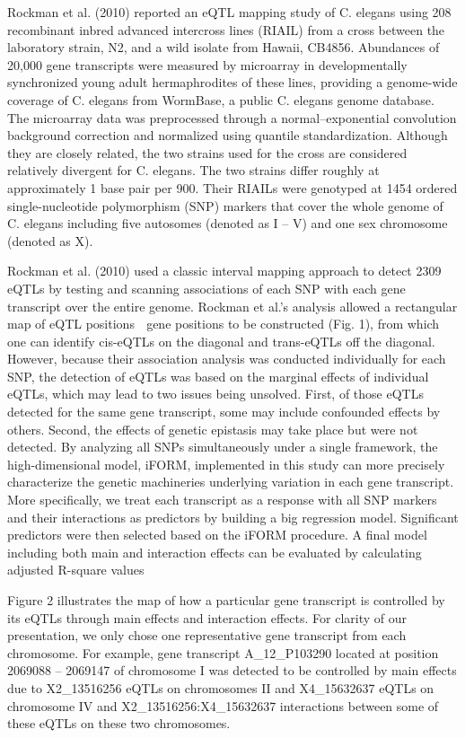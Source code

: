 \documentclass[]{book}
\theoremstyle{definition}
\theoremstyle{definition}
\theoremstyle{remark}
\begin{document}
Rockman et al. (2010) reported an eQTL mapping study of C. elegans using
208 recombinant inbred advanced intercross lines (RIAIL) from a cross
between the laboratory strain, N2, and a wild isolate from Hawaii,
CB4856. Abundances of 20,000 gene transcripts were measured by
microarray in developmentally synchronized young adult hermaphrodites of
these lines, providing a genome-wide coverage of C. elegans from
WormBase, a public C. elegans genome database. The microarray data was
preprocessed through a normal--exponential convolution background
correction and normalized using quantile standardization. Although they
are closely related, the two strains used for the cross are considered
relatively divergent for C. elegans. The two strains differ roughly at
approximately 1 base pair per 900. Their RIAILs were genotyped at 1454
ordered single-nucleotide polymorphism (SNP) markers that cover the
whole genome of C. elegans including five autosomes (denoted as I -- V)
and one sex chromosome (denoted as X).

Rockman et al. (2010) used a classic interval mapping approach to detect
2309 eQTLs by testing and scanning associations of each SNP with each
gene transcript over the entire genome. Rockman et al.'s analysis
allowed a rectangular map of eQTL positions  gene positions to be
constructed (Fig. 1), from which one can identify cis-eQTLs on the
diagonal and trans-eQTLs off the diagonal. However, because their
association analysis was conducted individually for each SNP, the
detection of eQTLs was based on the marginal effects of individual
eQTLs, which may lead to two issues being unsolved. First, of those
eQTLs detected for the same gene transcript, some may include confounded
effects by others. Second, the effects of genetic epistasis may take
place but were not detected. By analyzing all SNPs simultaneously under
a single framework, the high-dimensional model, iFORM, implemented in
this study can more precisely characterize the genetic machineries
underlying variation in each gene transcript. More specifically, we
treat each transcript as a response with all SNP markers and their
interactions as predictors by building a big regression model.
Significant predictors were then selected based on the iFORM procedure.
A final model including both main and interaction effects can be
evaluated by calculating adjusted R-square values

Figure 2 illustrates the map of how a particular gene transcript is
controlled by its eQTLs through main effects and interaction effects.
For clarity of our presentation, we only chose one representative gene
transcript from each chromosome. For example, gene transcript
A\_12\_P103290 located at position 2069088 -- 2069147 of chromosome I
was detected to be controlled by main effects due to X2\_13516256 eQTLs
on chromosomes II and X4\_15632637 eQTLs on chromosome IV and
X2\_13516256:X4\_15632637 interactions between some of these eQTLs on
these two chromosomes.
\end{document}
